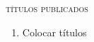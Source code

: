 
\ifodd\thepage\paginabranca\else\clearpage\fi
\pagestyle{empty}

{\textsc{títulos publicados}
\begin{enumerate}
\setlength\itemsep{-1.4mm}
\fontsize{7}{8}\selectfont
\item Colocar títulos
\vfill
\end{enumerate}
}%

\pagebreak
\ifodd\thepage\paginabranca\else\clearpage\fi
